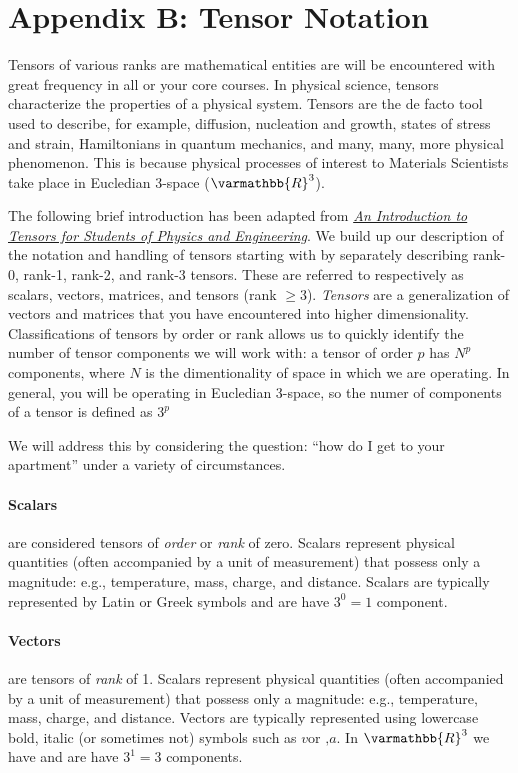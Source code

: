 \section*{Appendix B: Tensor Notation} \label{app:AppendixB}

Tensors of various ranks are mathematical entities are will be encountered with great frequency in all or your core courses. In physical science, tensors characterize the properties of a physical system. Tensors are the de facto tool used to describe, for example, diffusion, nucleation and growth, states of stress and strain, Hamiltonians in quantum mechanics, and many, many, more physical phenomenon. This is because physical processes of interest to Materials Scientists take place in Eucledian 3-space ($\varmathbb{R}^3$).

The following brief introduction has been adapted from \href{https://www.grc.nasa.gov/www/k-12/Numbers/Math/documents/Tensors_TM2002211716.pdf}{\textit{An Introduction to Tensors for Students of Physics and Engineering}}. We build up our description of the notation and handling of tensors starting with by separately describing rank-0, rank-1, rank-2, and rank-3 tensors. These are referred to respectively as scalars, vectors, matrices, and tensors (rank $\geq3$). \emph{Tensors} are a generalization of vectors and matrices that you have encountered into higher dimensionality. Classifications of tensors by order or rank allows us to quickly identify the number of tensor components we will work with: a tensor of order $p$ has $N^p$ components, where $N$ is the dimentionality of space in which we are operating. In general, you will be operating in Eucledian 3-space, so the numer of components of a tensor is defined as $3^p$

We will address this by considering the question: ``how do I get to your apartment'' under a variety of circumstances. 

\paragraph{Scalars} are considered tensors of \emph{order} or \emph{rank} of zero. Scalars represent physical quantities (often accompanied by a unit of measurement) that possess only a magnitude: e.g., temperature, mass, charge, and distance. Scalars are typically represented by Latin or Greek symbols and are have $3^{0} = 1$ component.

\paragraph{Vectors} are tensors of \emph{rank} of 1. Scalars represent physical quantities (often accompanied by a unit of measurement) that possess only a magnitude: e.g., temperature, mass, charge, and distance. Vectors are typically represented using lowercase bold, italic (or sometimes not) symbols such as $v \text{or ,} a$. In $\varmathbb{R}^3$ we have and are have $3^{1} = 3$ components.
